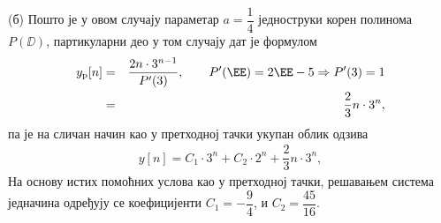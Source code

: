 (б) Пошто је у овом случају параметар $a = \dfrac{1}{4}$ једноструки корен полинома $P(\DD)$, партикуларни део у том случају дат је формулом 
\begin{eqnarray}
    y_{\rm p}[n] &=& \dfrac{ 2 n \cdot 3^{n-1} }{ P'(3) }, \qquad P'(\EE) = 2\EE - 5 \Rightarrow P'(3) = 1 \\
                 &=& \dfrac{2}{3}n \cdot 3^n,
\end{eqnarray}
па је на сличан начин као у претходној тачки укупан облик одзива 
\begin{eqnarray}
    y[n] = C_1 \cdot 3^n + C_2 \cdot 2^n + \dfrac{2}{3}n \cdot 3^{n},
\end{eqnarray}
На основу истих помоћних услова као у претходној тачки, решавањем система једначина одређују се коефицијенти 
$C_1 = - \dfrac{9}{4}$, и $C_2 = \dfrac{45}{16}$.
